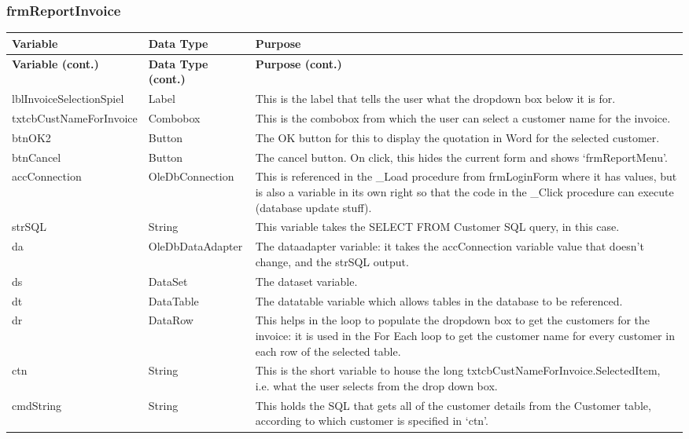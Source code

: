 	\subsubsection{frmReportInvoice}
	\begin{longtable}{ | p{4cm} | p{3cm} | p{10cm} |}
		\hline
		\textbf{Variable} & \textbf{Data Type} & \textbf{Purpose}\\
		\endfirsthead
		\hline
		\textbf{Variable (cont.)} & \textbf{Data Type (cont.)} & \textbf{Purpose (cont.)}\\
		\endhead
		\hline
		lblInvoiceSelectionSpiel & Label & This is the label that tells the user what the dropdown box below it is for.\\
		\hline
		txtcbCustNameForInvoice & Combobox & This is the combobox from which the user can select a customer name for the invoice.\\
		\hline
		btnOK2 & Button & The OK button for this to display the quotation in Word for the selected customer.\\
		\hline
		btnCancel & Button & The cancel button.  On click, this hides the current form and shows `frmReportMenu'.\\
		\hline
		accConnection & OleDbConnection & This is referenced in the \_Load procedure from frmLoginForm where it has values, but is also a variable in its own right so that the code in the \_Click procedure can execute (database update stuff).\\
		\hline
		strSQL & String & This variable takes the SELECT FROM Customer SQL query, in this case.\\
		\hline
		da & OleDbDataAdapter & The dataadapter variable: it takes the accConnection variable value that doesn't change, and the strSQL output.\\
		\hline
		ds & DataSet & The dataset variable.\\
		\hline
		dt & DataTable & The datatable variable which allows tables in the database to be referenced.\\
		\hline
		dr & DataRow & This helps in the loop to populate the dropdown box to get the customers for the invoice: it is used in the For Each loop to get the customer name for every customer in each row of the selected table.\\
		\hline
		ctn & String & This is the short variable to house the long txtcbCustNameForInvoice.SelectedItem, i.e. what the user selects from the drop down box.\\
		\hline
		cmdString & String & This holds the SQL that gets all of the customer details from the Customer table, according to which customer is specified in `ctn'.\\

\end{longtable}
